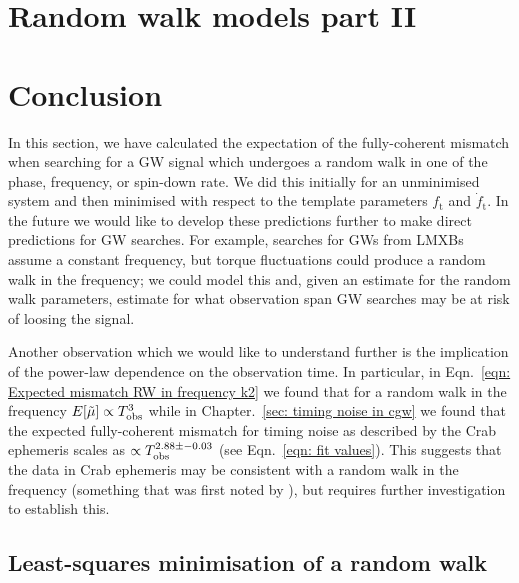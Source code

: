 \documentclass[../full_thesis/full_thesis.tex]{subfiles}
\newcommand{\thisdir}{../analytic_timing_noise_cgw}
\begin{document}
\section{Random walk models part II} 
\label{sec: Random walk models part II}


\section{Conclusion}

In this section, we have calculated the expectation of the fully-coherent
mismatch when searching for a GW signal which undergoes a random walk in one of
the phase, frequency, or spin-down rate. We did this initially for an
unminimised system and then minimised with respect to the template parameters
$f_\textrm{t}$ and $\dot{f}_\textrm{t}$. In the future we would like to develop
these predictions further to make direct predictions for GW searches. For example,
searches for GWs from LMXBs assume a constant frequency, but torque fluctuations
could produce a random walk in the frequency; we could model this and, given
an estimate for the random walk parameters, estimate for what observation span
GW searches may be at risk of loosing the signal.

Another observation which we would like to understand further is the
implication of the power-law dependence on the observation time. In particular,
in Eqn.~\eqref{eqn: Expected mismatch RW in frequency k2} we found that for
a random walk in the frequency
$E[\tilde{\mu}] \propto T_{\mathrm{obs}} ^{3}$ while in Chapter.~\ref{sec: timing noise in
cgw} we found that the expected fully-coherent mismatch for timing noise as
described by the Crab ephemeris scales as $\propto T_{\mathrm{obs}}^{2.88\pm-0.03}$ (see
Eqn.~\eqref{eqn: fit values}). This suggests that the data in Crab ephemeris
may be consistent with a random walk in the frequency (something that was
first noted by \citet{Boynton1972}), but requires further investigation to
establish this.


\begin{subappendices}


\section{Least-squares minimisation of a random walk}
\label{sec: least squares minimisation of a random walk}



\end{subappendices}


\biblio
\end{document}
